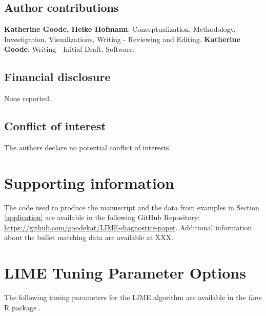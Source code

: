 \documentclass[AMS,STIX2COL]{WileyNJD-v2}\usepackage[]{graphicx}\usepackage[]{color}
\begin{document}
\subsection*{Author contributions}

{\bf Katherine Goode, Heike Hofmann}: Conceptualization, Methodology, Investigation, Visualizations, Writing - Reviewing and Editing. {\bf Katherine Goode}: Writing - Initial Draft, Software.

\subsection*{Financial disclosure}

None reported.

\subsection*{Conflict of interest}

The authors declare no potential conflict of interests.

\section*{Supporting information}

The code used to produce the manuscript and the data from examples in Section \ref{application} are available in the following GitHub Repository: \href{https://github.com/goodekat/LIME-diagnostics-paper}{https://github.com/goodekat/LIME-diagnostics-paper}. Additional information about the bullet matching data are available at XXX.



\newpage

\appendix

\section{LIME Tuning Parameter Options} \label{lime-details}

The following tuning parameters for the LIME algorithm are available in the \emph{lime} R package \citep{pedersen:2020}.
\end{document}
